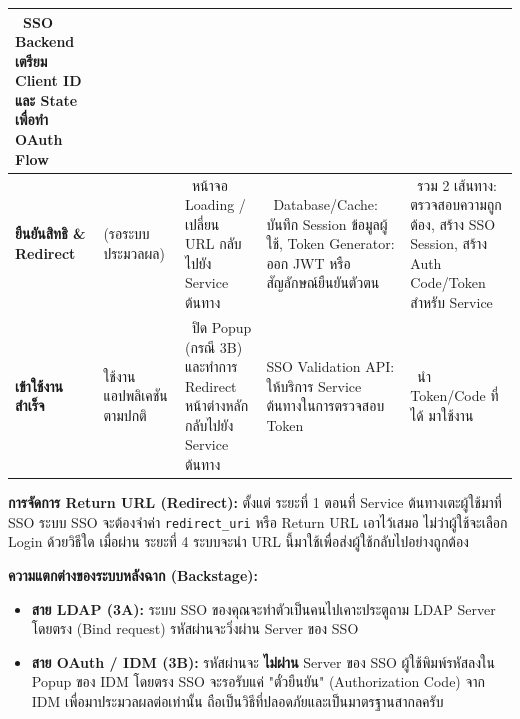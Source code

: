 \begin{tabular}{|p{3cm}|p{3cm}|p{3cm}|p{3cm}|p{3cm}|}
\begin{minipage}[t]{2.5cm}
\ SSO Backend เตรียม Client ID และ State เพื่อทำ OAuth Flow
\end{minipage} \\
\hline
\textbf{ยืนยันสิทธิ \& Redirect} & \begin{minipage}[t]{2.5cm}\raggedright
(รอระบบประมวลผล)
\end{minipage} & \begin{minipage}[t]{2.5cm}\raggedright
\ หน้าจอ Loading / เปลี่ยน URL กลับไปยัง Service ต้นทาง
\end{minipage} & \begin{minipage}[t]{2.5cm}\raggedright
\ Database/Cache: บันทึก Session ข้อมูลผู้ใช้, Token Generator: ออก JWT หรือสัญลักษณ์ยืนยันตัวตน
\end{minipage} & \begin{minipage}[t]{2.5cm}\raggedright
\ รวม 2 เส้นทาง: ตรวจสอบความถูกต้อง, สร้าง SSO Session, สร้าง Auth Code/Token สำหรับ Service
\end{minipage} \\
\hline
\textbf{เข้าใช้งานสำเร็จ} & \begin{minipage}[t]{2.5cm}\raggedright
ใช้งานแอปพลิเคชัน ตามปกติ
\end{minipage} & \begin{minipage}[t]{2.5cm}\raggedright
\ ปิด Popup (กรณี 3B) และทำการ Redirect หน้าต่างหลักกลับไปยัง Service ต้นทาง
\end{minipage} & \begin{minipage}[t]{2.5cm}\raggedright
SSO Validation API: ให้บริการ Service ต้นทางในการตรวจสอบ Token
\end{minipage} & \begin{minipage}[t]{2.5cm}\raggedright
\ นำ Token/Code ที่ได้ มาใช้งาน
\end{minipage} \\
\hline
\end{tabular}

\newpage
\textbf{การจัดการ Return URL (Redirect):} ตั้งแต่ ระยะที่ 1 ตอนที่ Service ต้นทางเตะผู้ใช้มาที่ SSO ระบบ SSO จะต้องจำค่า \texttt{redirect\_uri} หรือ Return URL เอาไว้เสมอ ไม่ว่าผู้ใช้จะเลือก Login ด้วยวิธีใด เมื่อผ่าน ระยะที่ 4 ระบบจะนำ URL นี้มาใช้เพื่อส่งผู้ใช้กลับไปอย่างถูกต้อง

\bigskip

\textbf{ความแตกต่างของระบบหลังฉาก (Backstage):}

\begin{itemize}
    \item \textbf{สาย LDAP (3A):} ระบบ SSO ของคุณจะทำตัวเป็นคนไปเคาะประตูถาม LDAP Server โดยตรง (Bind request) รหัสผ่านจะวิ่งผ่าน Server ของ SSO
    \item \textbf{สาย OAuth / IDM (3B):} รหัสผ่านจะ \textbf{ไม่ผ่าน} Server ของ SSO ผู้ใช้พิมพ์รหัสลงใน Popup ของ IDM โดยตรง SSO จะรอรับแค่ "ตั๋วยืนยัน" (Authorization Code) จาก IDM เพื่อมาประมวลผลต่อเท่านั้น ถือเป็นวิธีที่ปลอดภัยและเป็นมาตรฐานสากลครับ
\end{itemize}

